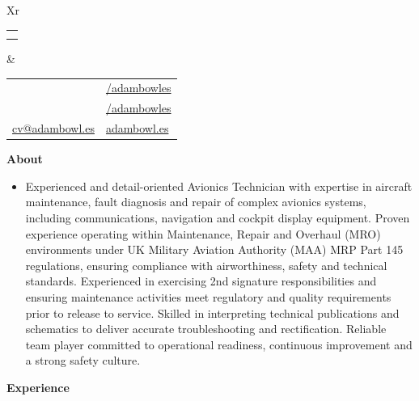 \documentclass[a4paper,12pt]{article}[leftmargin=*]
\makeatletter
\def \fullname {Adam Bowles}
\def \subtitle {}
\def \linkedinicon {\faLinkedin}
\def \linkedinlink {https://linkedin.com/in/adambowles/}
\def \linkedintext {/adambowles}
\def \phoneicon {\faPhone}
\def \phonetext {+44 (0) 7584 356713}
\def \addressicon {\faHome}
\def \addresstext {108 Woodside View, Suffolk, IP31 1LX}
\def \emailicon {\faEnvelope}
\def \emaillink {mailto:cv@adambowl.es}
\def \emailtext {cv@adambowl.es}
\def \githubicon {\faGithub}
\def \githublink {https://github.com/adambowles}
\def \githubtext {/adambowles}
\def \websiteicon {\faGlobe}
\def \websitelink {https://adambowl.es/}
\def \websitetext {adambowl.es}
\def \headertype {\doublecol} %
\def \entryspacing {-0pt}
\def \linkedin {\linkedinicon \hspace{3pt}\href{\linkedinlink}{\linkedintext}}
\def \phone {\phoneicon \hspace{3pt}{ \phonetext}}
\def \address {\addressicon \hspace{3pt}{ \addresstext}}
\def \email {\emailicon \hspace{3pt}\href{\emaillink}{\emailtext}}
\def \github {\githubicon \hspace{3pt}\href{\githublink}{\githubtext}}
\def \website {\websiteicon \hspace{3pt}\href{\websitelink}{\websitetext}}
\renewcommand{\section}[2]{\vspace{5pt}
  \colorbox{secondary}{\color{white}\raggedbottom\normalsize\textbf{{#1}{\hspace{7pt}#2}}}
}
\newcommand{\resumeEntryStart}{\begin{itemize}[leftmargin=2.5mm]}
\newcommand{\resumeEntryEnd}{\end{itemize}\vspace{\entryspacing}}
\newcommand{\resumeEntryBio}[1]{
  \item[]\small{
    {#1}
  }
}
\newcommand{\doublecol}[6]{
  \begin{tabularx}{\textwidth}{Xr}
    {
      \begin{tabular}[c]{l}
        \fontsize{35}{45}\selectfont{\color{primary}{{\textbf{\fullname}}}} \\
        {\textit{\subtitle}} %
      \end{tabular}
    } & {
      \begin{tabular}[c]{l@{\hspace{1.5em}}l}
        {\small#4} & {\small#1} \\
        {\small#5} & {\small#2} \\
        {\small#6} & {\small#3}
      \end{tabular}
    }
  \end{tabularx}
}
\newcommand{\singlecol}[6]{
  \begin{tabularx}{\textwidth}{Xr}
    {
      \begin{tabular}[b]{l}
        \fontsize{35}{45}\selectfont{\color{primary}{{\textbf{\fullname}}}} \\
        {\textit{\subtitle}} %
      \end{tabular}
    } & {
      \begin{tabular}[c]{l}
        {\small#1} \\
        {\small#2} \\
        {\small#3} \\
        {\small#4} \\
        {\small#5} \\
        {\small#6}
      \end{tabular}
    }
  \end{tabularx}
}
\makeatother
\begin{document}


\headertype{\linkedin}{\github}{\website}{\phone}{\address}{\email} %
\vspace{-10pt} %

\section{\faUser}{About}

  \resumeEntryStart
    \resumeEntryBio{Experienced and detail-oriented Avionics Technician with expertise in aircraft maintenance, fault diagnosis and repair of complex avionics systems, including communications, navigation and cockpit display equipment. Proven experience operating within Maintenance, Repair and Overhaul (MRO) environments under UK Military Aviation Authority (MAA) MRP Part 145 regulations, ensuring compliance with airworthiness, safety and technical standards. Experienced in exercising 2nd signature responsibilities and ensuring maintenance activities meet regulatory and quality requirements prior to release to service. Skilled in interpreting technical publications and schematics to deliver accurate troubleshooting and rectification. Reliable team player committed to operational readiness, continuous improvement and a strong safety culture.}
 \resumeEntryEnd

\section{\faWrench}{Experience}
\end{document}
